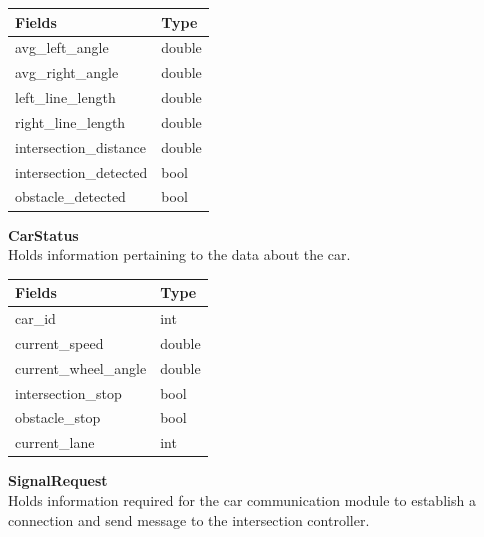 \documentclass [10pt]{article}
\begin{document}




\begin{longtable}{ p{ }  p{ }} \\ 
    \rowcolor{tableCell}\textbf{Fields} & \textbf{Type} \\ \hline
    \rowcolor{tableCell}avg\_left\_angle & double \\ \hline
    \rowcolor{tableCell}avg\_right\_angle & double \\ \hline
    \rowcolor{tableCell}left\_line\_length & double \\ \hline
    \rowcolor{tableCell}right\_line\_length& double \\ \hline
    \rowcolor{tableCell}intersection\_distance & double \\ \hline
    \rowcolor{tableCell}intersection\_detected & bool \\ \hline
    \rowcolor{tableCell}obstacle\_detected & bool \\ \hline
    
\end{longtable}

\textbf{CarStatus}\\
\indent \indent Holds information pertaining to the data about the car. \\


\begin{longtable}{ p{ }  p{ }} \\ 
    \rowcolor{tableCell}\textbf{Fields} & \textbf{Type} \\ \hline
    \rowcolor{tableCell}car\_id & int \\ \hline
    \rowcolor{tableCell}current\_speed & double \\ \hline
    \rowcolor{tableCell}current\_wheel\_angle & double \\ \hline
    \rowcolor{tableCell}intersection\_stop & bool \\ \hline
    \rowcolor{tableCell}obstacle\_stop & bool\\ \hline
   \rowcolor{tableCell}current\_lane & int \\ \hline
\end{longtable}

\textbf{SignalRequest}\\
\indent \indent Holds information required for the car communication module to establish a connection and send message to the intersection controller. \\
\end{document}
